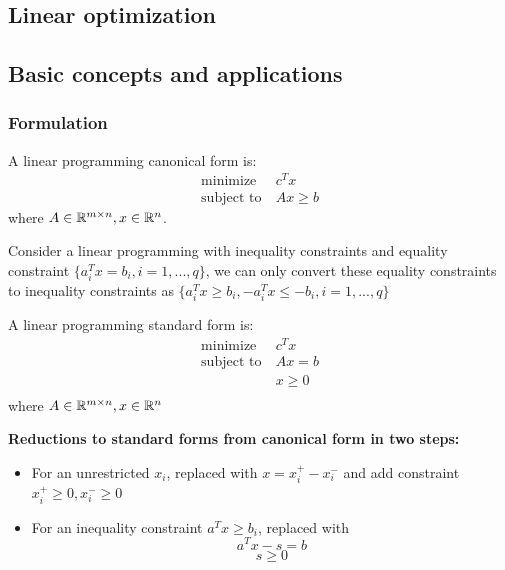 \begin{refsection}
\startcontents[chapters]
\chapter{Linear optimization}\label{ch:linear-optimization}
	
\section{Basic concepts and applications}
\subsection{Formulation}
\begin{definition}
	A linear programming canonical form is:
	\begin{align*}
	\text{minimize} ~ &c^Tx\\
	\text{subject to} ~ & Ax\geq b
	\end{align*}
	where $A\in \mathbb{R}^{m\times n},x\in \mathbb{R}^n$.
\end{definition}

\begin{remark}
	Consider a linear programming with inequality constraints and equality constraint $\{a_i^T x = b_i,i=1,...,q\}$, we can only convert these equality constraints to inequality constraints as $\{a_i^T x \geq b_i, -a_i^T x \leq -b_i,i=1,...,q\}$
\end{remark}


\begin{definition}
\cite[4]{bertsimas1997introduction} A linear programming standard form is:
\begin{align*}
    \text{minimize} ~ &c^Tx\\
    \text{subject to} ~ & Ax=b\\
    & x\geq 0\\
\end{align*}
 where $A\in \mathbb{R}^{m\times n},x\in \mathbb{R}^n$

\end{definition}

\begin{mdframed}
	\textbf{Reductions to standard forms from canonical form in two steps:\cite[5]{bertsimas1997introduction}}\\
	\begin{itemize}
		\item For an unrestricted $x_i$, replaced with $x = x_i^+ - x_i^-$ and add constraint $x_i^+ \geq 0, x_i^- \geq 0$
		\item For an inequality constraint $a^Tx \geq b_i$, replaced with
		$$a^Tx - s =b$$
		$$s \geq 0$$
	\end{itemize}
\end{mdframed}


\end{refsection}
